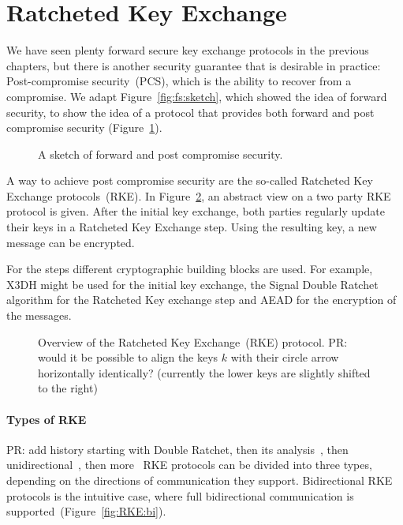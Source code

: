 \section{Ratcheted Key Exchange}
\label{sec:rke}

We have seen plenty forward secure key exchange protocols in the previous chapters, but there is another security guarantee that is desirable in practice:
Post-compromise security~(PCS), which is the ability to recover from a compromise.
We adapt Figure~\ref{fig:fs:sketch}, which showed the idea of forward security, to show the idea of a protocol that provides both forward and post compromise security (Figure~\ref{fig:rke:pcs_fs_overview}).

\begin{figure}[!ht]
    \centering
    
    \caption{A sketch of forward and post compromise security.}
    \label{fig:rke:pcs_fs_overview}
\end{figure}

A way to achieve post compromise security are the so-called Ratcheted Key Exchange protocols~(RKE).
In Figure~\ref{fig:rke:overview}, an abstract view on a two party RKE protocol is given.
After the initial key exchange, both parties regularly update their keys in a Ratcheted Key Exchange step.
Using the resulting key, a new message can be encrypted.

For the steps different cryptographic building blocks are used.
For example, X3DH might be used for the initial key exchange, the Signal Double Ratchet algorithm for the Ratcheted Key exchange step and AEAD for the encryption of the messages.

\begin{figure}[!ht]
    \centering
    
    \caption{Overview of the Ratcheted Key Exchange~(RKE) protocol.
    \alert{PR: would it be possible to align the keys $k$ with their circle arrow horizontally identically? (currently the lower keys are slightly shifted to the right)}}
    \label{fig:rke:overview}
\end{figure}

\paragraph{Types of RKE}
\alert{PR: add history starting with Double Ratchet, then its analysis~\cite{JC:CCDGS20}, then unidirectional~\cite{C:BSJNS17}, then more~\cite{C:PoeRos18}}
RKE protocols can be divided into three types, depending on the directions of communication they support.
Bidirectional RKE protocols is the intuitive case, where full bidirectional communication is supported~(Figure~\ref{fig:RKE:bi}).

